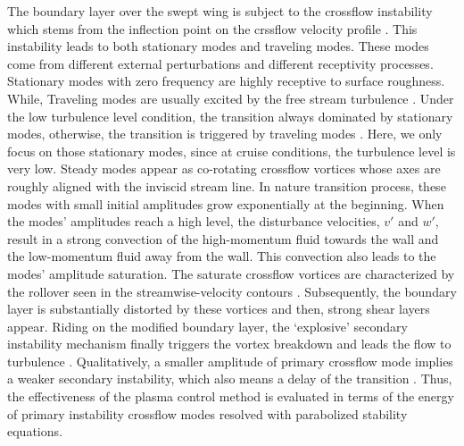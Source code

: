 \documentclass{AIAA}
\begin{document}
The boundary layer over the swept wing is subject to the crossflow instability which stems from the inflection point on the crssflow velocity profile \cite{Saric2003}. This instability leads to both stationary modes and traveling modes. These modes come from different external perturbations and different receptivity processes. Stationary modes with zero frequency are highly receptive to surface roughness. While, Traveling modes are usually excited by the free stream turbulence \cite{Schrader2008}. Under the low turbulence level condition, the transition always dominated by stationary modes, otherwise, the transition is triggered by traveling modes \cite{Bipps1999}. Here, we only focus on those stationary modes, since at cruise conditions, the turbulence level is very low. Steady modes appear as co-rotating crossflow vortices whose axes are roughly aligned with the inviscid stream line. In nature transition process, these modes with small initial amplitudes grow exponentially at the beginning. When the modes' amplitudes reach a high level, the disturbance velocities, $v'$ and $w'$, result in a strong convection of the high-momentum fluid towards the wall and the low-momentum fluid away from the wall. This convection also leads to the modes' amplitude saturation. The saturate crossflow vortices are characterized by the rollover seen in the streamwise-velocity contours \cite{Malik1994,Haynes2000}. Subsequently, the boundary layer is substantially distorted by these vortices and then, strong shear layers appear. Riding on the modified boundary layer, the `explosive' secondary instability mechanism finally triggers the vortex breakdown and leads the flow to turbulence \cite{White2005}. %
Qualitatively, a smaller amplitude of primary crossflow mode implies a weaker secondary instability, which also means a delay of the transition \cite{Li2015a}. Thus, the effectiveness of the plasma control method is evaluated in terms of the energy of primary instability crossflow modes resolved with parabolized stability equations.
\end{document}
